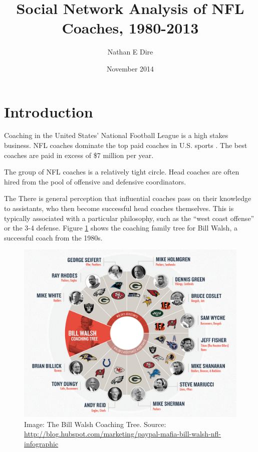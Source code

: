 \documentclass[11pt]{article}\usepackage[]{graphicx}\usepackage[]{color}
\begin{document}
\title{Social Network Analysis of NFL Coaches, 1980-2013}
\author{Nathan E Dire}
\date{November 2014}
\maketitle

\section{Introduction}

Coaching in the United States' National Football League is a high stakes
business.  NFL coaches dominate the top paid coaches in U.S. sports
\cite{forbes-pay}.  The best coaches are paid in excess of \$7 million per
year.

The group of NFL coaches is a relatively tight circle.  Head coaches are often
hired from the pool of offensive and defensive coordinators.  

The There is general perception that influential coaches pass on their
knowledge to assistants, who then become successful head coaches themselves.
This is typically associated with a particular philosophy, such as the ``west
coast offense'' or the 3-4 defense.  Figure \ref{fig-bill-walsh} shows the
coaching family tree for Bill Walsh, a successful coach from the 1980s.

\begin{figure}
\begin{center}
\includegraphics[width=\textwidth]{walsh_network.png}
\end{center}
\caption{Image: The Bill Walsh Coaching Tree. Source:
\url{http://blog.hubspot.com/marketing/paypal-mafia-bill-walsh-nfl-infographic}}
\label{fig-bill-walsh}
\end{figure}
\end{document}
